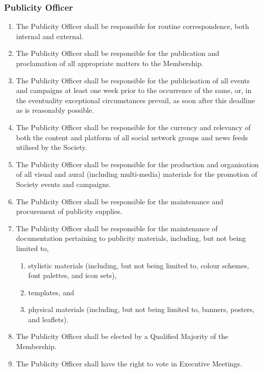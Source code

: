 \documentclass{scrartcl}
\begin{document}
            \subsubsection{Publicity Officer}
                \label{executive--positions--publicity-officer}
                \begin{enumerate}
                    \item The Publicity Officer shall be responsible for routine correspondence, both internal and external.
                    \item The Publicity Officer shall be responsible for the publication and proclamation of all appropriate matters to the Membership.
                    \item The Publicity Officer shall be responsible for the publicisation of all events and campaigns at least one week prior to the occurrence of the same, or, in the eventuality exceptional circumstances prevail, as soon after this deadline as is reasonably possible.
                    \item The Publicity Officer shall be responsible for the currency and relevancy of both the content and platform of all social network groups and news feeds utilised by the Society.
                    \item The Publicity Officer shall be responsible for the production and organisation of all visual and aural (including multi-media) materials for the promotion of Society events and campaigns.
                    \item The Publicity Officer shall be responsible for the maintenance and procurement of publicity supplies.
                    \item The Publicity Officer shall be responsible for the maintenance of documentation pertaining to publicity materials, including, but not being limited to,
                        \begin{enumerate}
                            \item stylistic materials (including, but not being limited to, colour schemes, font palettes, and icon sets),
                            \item templates, and
                            \item physical materials (including, but not being limited to, banners, posters, and leaflets).
                        \end{enumerate}
                    \item The Publicity Officer shall be elected by a Qualified Majority of the Membership.
                    \item The Publicity Officer shall have the right to vote in Executive Meetings.
                \end{enumerate}
\end{document}
